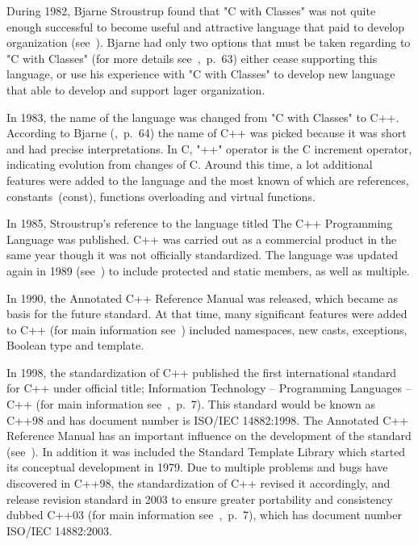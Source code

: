 \documentclass[11pt]{report}
\begin{document}
During 1982, Bjarne Stroustrup found that "C with Classes" was not quite enough successful to become useful and attractive language that paid to develop organization (see~\cite{StroustrupHistory}). Bjarne had only two options that must be taken regarding to "C with Classes" (for more details see~\cite{Stroustrup:1994:DesignEvolution},~p.~63) either cease supporting this language, or use his experience with "C with Classes" to develop new language that able to develop and support lager organization.

In 1983, the name of the language was changed from "C with Classes" to C++. According to Bjarne (\cite{Stroustrup:1994:DesignEvolution},~p.~64) the name of C++ was picked because it was short and had precise interpretations. In C, "++" operator is the C increment operator, indicating evolution from changes of C.  Around this time, a lot additional features were added to the language and the most known of which are references, constants~(const), functions overloading and virtual functions.

In 1985, Stroustrup's reference to the language titled The C++ Programming Language was published. C++ was carried out as a commercial product in the same year though it was not officially standardized. The language was updated again in 1989 (see~\cite{CplusplusHistoryofCpp}) to include protected and static members, as well as multiple.

In 1990, the Annotated C++ Reference Manual was released, which became as basis for the future standard. At that time, many significant features were added to C++  (for main information see~\cite{StroustrupHistory}) included namespaces, new casts, exceptions, Boolean type and template.

In 1998, the standardization of C++ published the first international standard for C++ under official title; Information Technology -- Programming Languages -- C++ (for main information see~\cite{Josuttis:2012:CppStandard},~p.~7). This standard would be known as C++98 and has document number is ISO/IEC 14882:1998. The Annotated C++ Reference Manual has an important influence on the development of the standard (see~\cite{CplusplusHistoryofCpp}). In addition it was included the Standard Template Library which started its conceptual development in 1979. Due to multiple problems and bugs have discovered in C++98, the standardization of C++ revised it accordingly, and release revision standard in 2003 to ensure greater portability and consistency dubbed C++03 (for main information see~\cite{Josuttis:2012:CppStandard},~p.~7), which has document number ISO/IEC 14882:2003.
\end{document}
